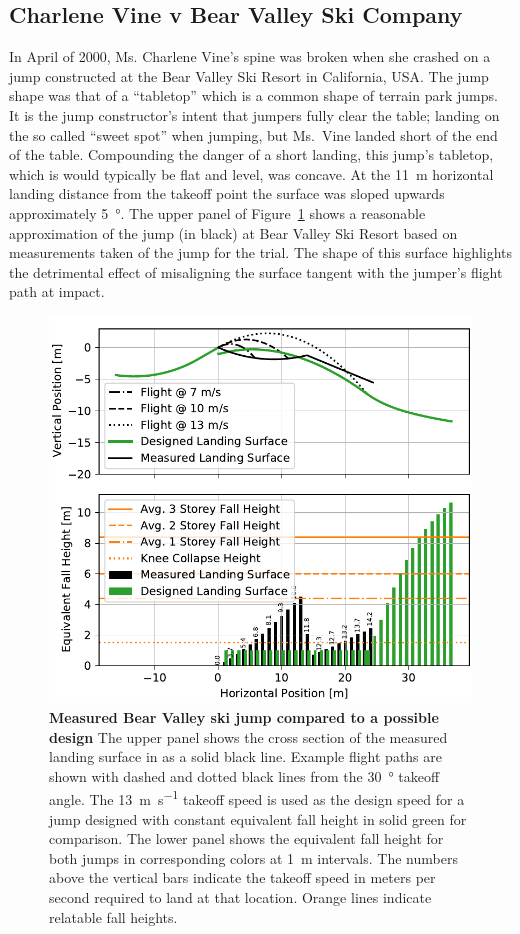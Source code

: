 \documentclass{article}
\begin{document}
\subsection{Charlene Vine v Bear Valley Ski Company}
%
In April of 2000, Ms. Charlene Vine's spine was broken when she crashed on a
jump constructed at the Bear Valley Ski Resort in California, USA. The jump
shape was that of a ``tabletop'' which is a common shape of terrain park jumps.
It is the jump constructor's intent that jumpers fully clear the table; landing
on the so called ``sweet spot'' when jumping, but Ms.~Vine landed short of the
end of the table.
Compounding the danger of a short landing, this jump's tabletop, which is
would typically be flat and level, was concave.
At the 11~\si{\meter} horizontal landing distance from the takeoff point the surface
was sloped upwards approximately 5~\si{\degree}.
The upper panel of Figure~\ref{fig:vine-v-bear-valley} shows a reasonable
approximation of the jump (in black) at Bear Valley Ski Resort based on
measurements taken of the jump for the trial.
The shape of this surface highlights the detrimental effect of misaligning the
surface tangent with the jumper's flight path at impact.
%
\begin{figure}
  \centering
  \includegraphics[width=5.25in]{figures/vine-v-bear-valley.pdf}
  \caption{\textbf{Measured Bear Valley ski jump compared to a possible design}
  The upper panel shows the cross section of the measured landing surface in as
  a solid black line. Example flight paths are shown with dashed and dotted
  black lines from the 30~\si{\degree} takeoff angle. The
  13~\si{\meter\per\second} takeoff speed is used as the design speed for a
  jump designed with constant equivalent fall height in solid green for
  comparison. The lower panel shows the equivalent fall height for both jumps
  in corresponding colors at 1~\si{\meter} intervals. The numbers above the
  vertical bars indicate the takeoff speed in meters per second required to
  land at that location. Orange lines indicate relatable fall heights.}
  \label{fig:vine-v-bear-valley}
\end{figure}
\end{document}
